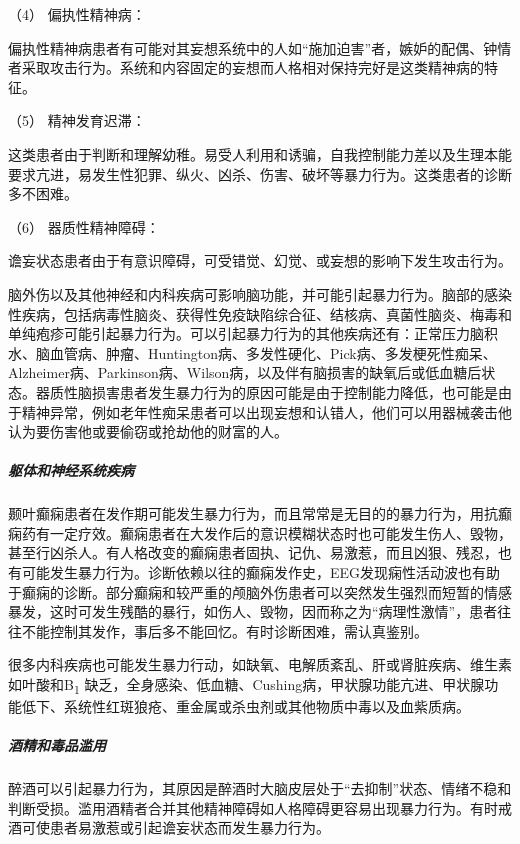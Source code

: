 \hypertarget{text00054.htmlux5cux23CHP1-18-12-2-1-4}{}
（4） 偏执性精神病：

偏执性精神病患者有可能对其妄想系统中的人如“施加迫害”者，嫉妒的配偶、钟情者采取攻击行为。系统和内容固定的妄想而人格相对保持完好是这类精神病的特征。

\hypertarget{text00054.htmlux5cux23CHP1-18-12-2-1-5}{}
（5） 精神发育迟滞：

这类患者由于判断和理解幼稚。易受人利用和诱骗，自我控制能力差以及生理本能要求亢进，易发生性犯罪、纵火、凶杀、伤害、破坏等暴力行为。这类患者的诊断多不困难。

\hypertarget{text00054.htmlux5cux23CHP1-18-12-2-1-6}{}
（6） 器质性精神障碍：

谵妄状态患者由于有意识障碍，可受错觉、幻觉、或妄想的影响下发生攻击行为。

脑外伤以及其他神经和内科疾病可影响脑功能，并可能引起暴力行为。脑部的感染性疾病，包括病毒性脑炎、获得性免疫缺陷综合征、结核病、真菌性脑炎、梅毒和单纯疱疹可能引起暴力行为。可以引起暴力行为的其他疾病还有：正常压力脑积水、脑血管病、肿瘤、Huntington病、多发性硬化、Pick病、多发梗死性痴呆、Alzheimer病、Parkinson病、Wilson病，以及伴有脑损害的缺氧后或低血糖后状态。器质性脑损害患者发生暴力行为的原因可能是由于控制能力降低，也可能是由于精神异常，例如老年性痴呆患者可以出现妄想和认错人，他们可以用器械袭击他认为要伤害他或要偷窃或抢劫他的财富的人。

\subparagraph{躯体和神经系统疾病}

颞叶癫痫患者在发作期可能发生暴力行为，而且常常是无目的的暴力行为，用抗癫痫药有一定疗效。癫痫患者在大发作后的意识模糊状态时也可能发生伤人、毁物，甚至行凶杀人。有人格改变的癫痫患者固执、记仇、易激惹，而且凶狠、残忍，也有可能发生暴力行为。诊断依赖以往的癫痫发作史，EEG发现痫性活动波也有助于癫痫的诊断。部分癫痫和较严重的颅脑外伤患者可以突然发生强烈而短暂的情感暴发，这时可发生残酷的暴行，如伤人、毁物，因而称之为“病理性激情”，患者往往不能控制其发作，事后多不能回忆。有时诊断困难，需认真鉴别。

很多内科疾病也可能发生暴力行动，如缺氧、电解质紊乱、肝或肾脏疾病、维生素如叶酸和B\textsubscript{1}
缺乏，全身感染、低血糖、Cushing病，甲状腺功能亢进、甲状腺功能低下、系统性红斑狼疮、重金属或杀虫剂或其他物质中毒以及血紫质病。

\subparagraph{酒精和毒品滥用}

醉酒可以引起暴力行为，其原因是醉酒时大脑皮层处于“去抑制”状态、情绪不稳和判断受损。滥用酒精者合并其他精神障碍如人格障碍更容易出现暴力行为。有时戒酒可使患者易激惹或引起谵妄状态而发生暴力行为。

